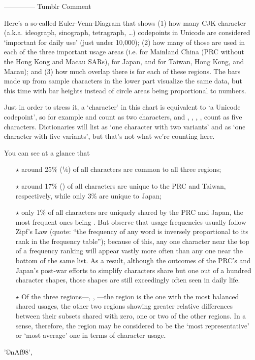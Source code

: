 \begin{multicols}{2}
--------------
Tumblr Comment\mktsShowpar\par
Here’s a so-called Euler-Venn-Diagram that shows (1) how many CJK character (a.k.a. ideograph, sinograph, tetragraph, …) codepoints in Unicode are considered ‘important for daily use’ (just under 10,000); (2) how many of those are used in each of the three important usage areas (i.e.  for Mainland China (PRC without the Hong Kong and Macau SARs),  for Japan, and  for Taiwan, Hong Kong, and Macau); and (3) how much overlap there is for each of these regions. The bars made up from sample characters in the lower part visualize the same data, but this time with bar heights instead of circle areas being proportional to numbers.\mktsShowpar\par
Just in order to stress it, a ‘character’ in this chart is equivalent to ‘a Unicode codepoint’, so for example  and  count as two characters, and , , , ,  count as five characters. Dictionaries will list  as ‘one character with two variants’ and  as ‘one character with five variants’, but that’s not what we’re counting here.\mktsShowpar\par
You can see at a glance that\mktsShowpar\par
\begin{itemize}\item[$\star$] around 25\% (¼) of all characters are common to all three regions;\mktsShowpar\par

\item[$\star$] around 17\% () of all characters are unique to the PRC and Taiwan, respectively, while only 3\% are unique to Japan;\mktsShowpar\par

\item[$\star$] only 1\% of all characters are uniquely shared by the PRC and Japan, the most frequent ones being . But observe that usage frequencies usually follow Zipf’s Law (quote: “the frequency of any word is inversely proportional to its rank in the frequency table”); because of this, any one character near the top of a frequency ranking will appear vastly more often than any one near the bottom of the same list. As a result, although the outcomes of the PRC’s and Japan’s post-war efforts to simplify characters share but one out of a hundred character shapes, those shapes are still exceedingly often seen in daily life.\mktsShowpar\par

\item[$\star$] Of the three regions—, , —the  region is the one with the most balanced shared usages, the other two regions showing greater relative differences between their subsets shared with zero, one or two of the other regions. In a sense, therefore, the  region may be considered to be the ‘most representative’ or ‘most average’ one in terms of character usage.\mktsShowpar\par

\end{itemize}'©nAf98', \end{multicols}
